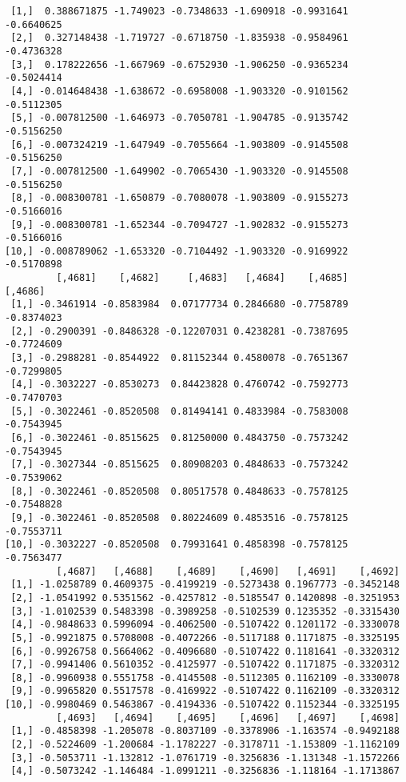 \documentclass[
  letterpaper,
  DIV=11,
  numbers=noendperiod]{scrreprt}
\begin{document}
\begin{verbatim}
 [1,]  0.388671875 -1.749023 -0.7348633 -1.690918 -0.9931641 -0.6640625
 [2,]  0.327148438 -1.719727 -0.6718750 -1.835938 -0.9584961 -0.4736328
 [3,]  0.178222656 -1.667969 -0.6752930 -1.906250 -0.9365234 -0.5024414
 [4,] -0.014648438 -1.638672 -0.6958008 -1.903320 -0.9101562 -0.5112305
 [5,] -0.007812500 -1.646973 -0.7050781 -1.904785 -0.9135742 -0.5156250
 [6,] -0.007324219 -1.647949 -0.7055664 -1.903809 -0.9145508 -0.5156250
 [7,] -0.007812500 -1.649902 -0.7065430 -1.903320 -0.9145508 -0.5156250
 [8,] -0.008300781 -1.650879 -0.7080078 -1.903809 -0.9155273 -0.5166016
 [9,] -0.008300781 -1.652344 -0.7094727 -1.902832 -0.9155273 -0.5166016
[10,] -0.008789062 -1.653320 -0.7104492 -1.903320 -0.9169922 -0.5170898
         [,4681]    [,4682]     [,4683]   [,4684]    [,4685]    [,4686]
 [1,] -0.3461914 -0.8583984  0.07177734 0.2846680 -0.7758789 -0.8374023
 [2,] -0.2900391 -0.8486328 -0.12207031 0.4238281 -0.7387695 -0.7724609
 [3,] -0.2988281 -0.8544922  0.81152344 0.4580078 -0.7651367 -0.7299805
 [4,] -0.3032227 -0.8530273  0.84423828 0.4760742 -0.7592773 -0.7470703
 [5,] -0.3022461 -0.8520508  0.81494141 0.4833984 -0.7583008 -0.7543945
 [6,] -0.3022461 -0.8515625  0.81250000 0.4843750 -0.7573242 -0.7543945
 [7,] -0.3027344 -0.8515625  0.80908203 0.4848633 -0.7573242 -0.7539062
 [8,] -0.3022461 -0.8520508  0.80517578 0.4848633 -0.7578125 -0.7548828
 [9,] -0.3022461 -0.8520508  0.80224609 0.4853516 -0.7578125 -0.7553711
[10,] -0.3032227 -0.8520508  0.79931641 0.4858398 -0.7578125 -0.7563477
         [,4687]   [,4688]    [,4689]    [,4690]   [,4691]    [,4692]
 [1,] -1.0258789 0.4609375 -0.4199219 -0.5273438 0.1967773 -0.3452148
 [2,] -1.0541992 0.5351562 -0.4257812 -0.5185547 0.1420898 -0.3251953
 [3,] -1.0102539 0.5483398 -0.3989258 -0.5102539 0.1235352 -0.3315430
 [4,] -0.9848633 0.5996094 -0.4062500 -0.5107422 0.1201172 -0.3330078
 [5,] -0.9921875 0.5708008 -0.4072266 -0.5117188 0.1171875 -0.3325195
 [6,] -0.9926758 0.5664062 -0.4096680 -0.5107422 0.1181641 -0.3320312
 [7,] -0.9941406 0.5610352 -0.4125977 -0.5107422 0.1171875 -0.3320312
 [8,] -0.9960938 0.5551758 -0.4145508 -0.5112305 0.1162109 -0.3330078
 [9,] -0.9965820 0.5517578 -0.4169922 -0.5107422 0.1162109 -0.3320312
[10,] -0.9980469 0.5463867 -0.4194336 -0.5107422 0.1152344 -0.3325195
         [,4693]   [,4694]    [,4695]    [,4696]   [,4697]    [,4698]
 [1,] -0.4858398 -1.205078 -0.8037109 -0.3378906 -1.163574 -0.9492188
 [2,] -0.5224609 -1.200684 -1.1782227 -0.3178711 -1.153809 -1.1162109
 [3,] -0.5053711 -1.132812 -1.0761719 -0.3256836 -1.131348 -1.1572266
 [4,] -0.5073242 -1.146484 -1.0991211 -0.3256836 -1.118164 -1.1713867

\end{verbatim}
\end{document}
